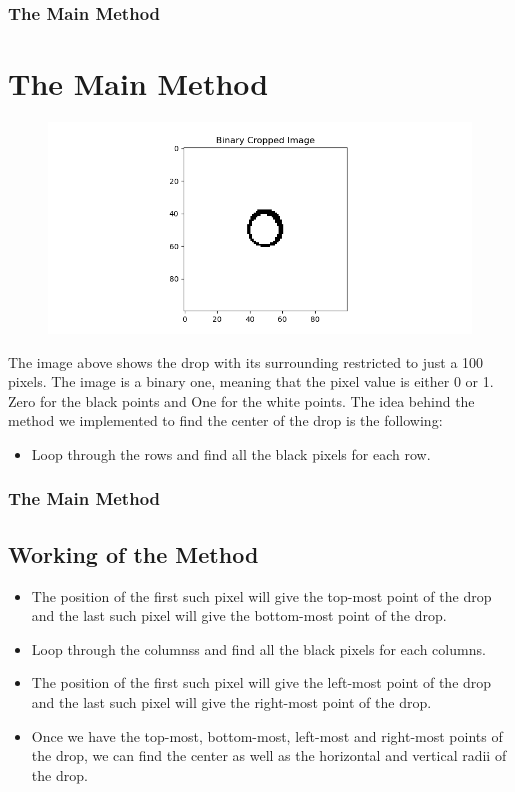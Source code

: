 \documentclass{beamer}
\begin{document}
\begin{frame}
    \frametitle{The Main Method}
    \section{The Main Method}
    \begin{figure}
        \centering
        \includegraphics[scale=0.4]{small.png}
    \end{figure}
    The image above shows the drop with its surrounding restricted to just a 100 pixels. The image is a binary one, meaning that the pixel value is either 0 or 1. Zero for the black points and One for the white points. The idea behind the method we implemented to find the center of the drop is the following:
    \begin{itemize}
        \item <2-> Loop through the rows and find all the black pixels for each row.
    \end{itemize}
\end{frame}
\begin{frame}
    \frametitle{The Main Method}
    \subsection{Working of the Method}
    \begin{itemize}
        \item <1-> The position of the first such pixel will give the top-most point of the drop and the last such pixel will give the bottom-most point of the drop.
        \item <2-> Loop through the columnss and find all the black pixels for each columns.
        \item <3-> The position of the first such pixel will give the left-most point of the drop and the last such pixel will give the right-most point of the drop.
        \item <4-> Once we have the top-most, bottom-most, left-most and right-most points of the drop, we can find the center as well as the horizontal and vertical radii of the drop.
    \end{itemize}
\end{frame}
\end{document}
